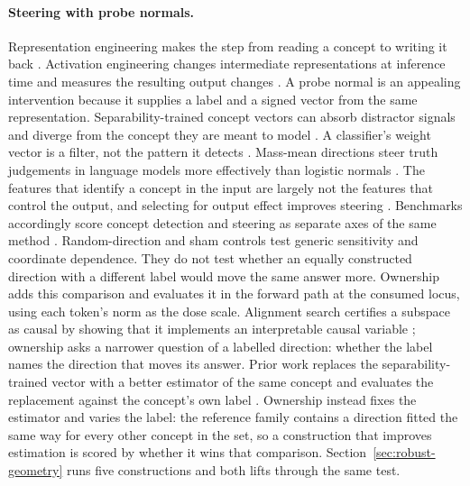 \documentclass{article}
\begin{document}
\paragraph{Steering with probe normals.}
Representation engineering makes the step from reading a concept to writing it back \citep{zou2023representation}. Activation engineering changes intermediate representations at inference time and measures the resulting output changes \citep{turner2023steering,panickssery2024caa}. A probe normal is an appealing intervention because it supplies a label and a signed vector from the same representation. Separability-trained concept vectors can absorb distractor signals and diverge from the concept they are meant to model \citep{pahde2025navigating}. A classifier's weight vector is a filter, not the pattern it detects \citep{haufe2014interpretation}. Mass-mean directions steer truth judgements in language models more effectively than logistic normals \citep{marks2024geometry}. The features that identify a concept in the input are largely not the features that control the output, and selecting for output effect improves steering \citep{arad2025saes}. Benchmarks accordingly score concept detection and steering as separate axes of the same method \citep{wu2025axbench}. Random-direction and sham controls test generic sensitivity and coordinate dependence. They do not test whether an equally constructed direction with a different label would move the same answer more. Ownership adds this comparison and evaluates it in the forward path at the consumed locus, using each token's norm as the dose scale. Alignment search certifies a subspace as causal by showing that it implements an interpretable causal variable \citep{geiger2024alignments}; ownership asks a narrower question of a labelled direction: whether the label names the direction that moves its answer. Prior work replaces the separability-trained vector with a better estimator of the same concept and evaluates the replacement against the concept's own label \citep{pahde2025navigating,haufe2014interpretation,marks2024geometry}. Ownership instead fixes the estimator and varies the label: the reference family contains a direction fitted the same way for every other concept in the set, so a construction that improves estimation is scored by whether it wins that comparison. Section~\ref{sec:robust-geometry} runs five constructions and both lifts through the same test.
\end{document}
